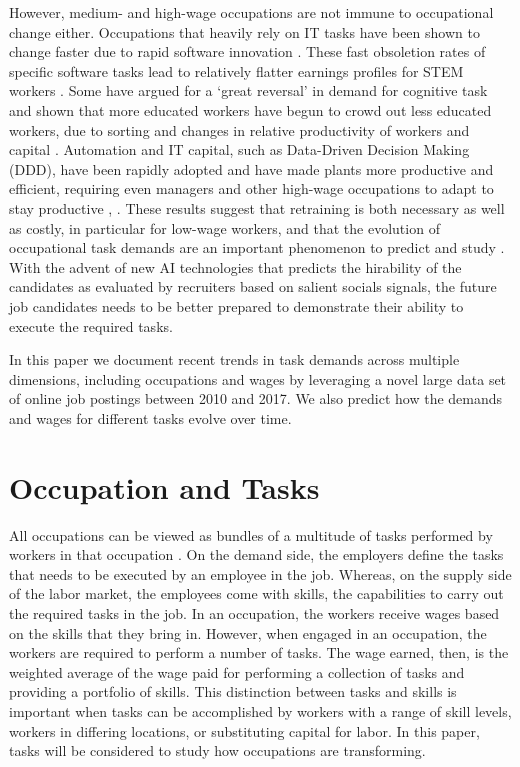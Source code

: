 \documentclass[letterpaper]{article} %
\begin{document}
However, medium- and high-wage occupations are not immune to occupational change either. Occupations that heavily rely on IT tasks have been shown to change faster due to rapid software innovation \cite{Hershbein2018}. These fast obsoletion rates of specific software tasks lead to relatively flatter earnings profiles for STEM workers \cite{Deming2018a}. Some have argued for a `great reversal' in demand for cognitive task and shown that more educated workers have begun to crowd out less educated workers, due to sorting and changes in relative productivity of workers and capital \cite{BeaudryGreenSand2015}. Automation and IT capital, such as Data-Driven Decision Making (DDD), have been rapidly adopted and have made plants more productive and efficient, requiring even managers and other high-wage occupations to adapt to stay productive \cite{Brynjolfsson2016}, \cite{Bartel2007}. These results suggest that retraining is both necessary as well as costly, in particular for low-wage workers, and that the evolution of occupational task demands are an important phenomenon to predict and study \cite{atalay2019evolution}. With the advent of new AI technologies \cite{hemamou2019hirenet} that predicts the hirability of the candidates as evaluated by recruiters based on salient socials signals, the future job candidates needs to be better prepared to demonstrate their ability to execute the required tasks.
\par
In this paper we document recent trends in task demands across multiple dimensions, including occupations and wages by leveraging a novel large data set of online job postings between 2010 and 2017. We also predict how the demands and wages for different tasks evolve over time.


\section{Occupation and Tasks}
\label{sec:data}
All occupations can be viewed as bundles of a multitude of tasks performed by workers in that occupation \cite{Acemoglu2018c}. On the demand side, the employers define the tasks that needs to be executed by an employee in the job. Whereas, on the supply side of the labor market, the employees come with skills, the capabilities to carry out the required tasks in the job. In an occupation, the workers receive wages based on the skills that they bring in. However, when engaged in an occupation, the workers are required to perform a number of tasks. The wage earned, then, is the weighted average of the wage paid for performing a collection of tasks and providing a portfolio of skills. This distinction between tasks and skills is important when tasks can be accomplished by workers with a range of skill levels, workers in differing locations, or substituting capital for labor. In this paper, tasks will be considered to study how occupations are transforming.
\end{document}
